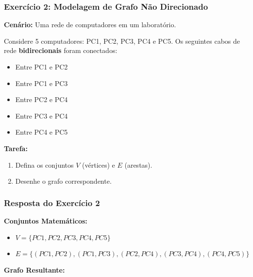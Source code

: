 \documentclass[9pt]{beamer}
\begin{document}
\begin{frame}
    \frametitle{Exercício 2: Modelagem de Grafo Não Direcionado}
    \textbf{Cenário:} Uma rede de computadores em um laboratório.
    \vspace{0.3cm}
    
    Considere 5 computadores: PC1, PC2, PC3, PC4 e PC5.
    Os seguintes cabos de rede \textbf{bidirecionais} foram conectados:
    \begin{itemize}
        \item Entre PC1 e PC2
        \item Entre PC1 e PC3
        \item Entre PC2 e PC4
        \item Entre PC3 e PC4
        \item Entre PC4 e PC5
    \end{itemize}
    \vspace{0.5cm}
    \textbf{Tarefa:} 
    \begin{enumerate}
        \item Defina os conjuntos $V$ (vértices) e $E$ (arestas).
        \item Desenhe o grafo correspondente.
    \end{enumerate}
\end{frame}

\begin{frame}
    \frametitle{Resposta do Exercício 2}
    \textbf{Conjuntos Matemáticos:}
    \begin{itemize}
        \item $V = \{PC1, PC2, PC3, PC4, PC5\}$
        \item $E = \{(PC1,PC2), (PC1,PC3), (PC2,PC4), (PC3,PC4), (PC4,PC5)\}$
    \end{itemize}
    \vspace{0.3cm}
    \begin{center}
        \textbf{Grafo Resultante:}\\
        \vspace{0.2cm}
    \end{center}
\end{frame}
\end{document}
